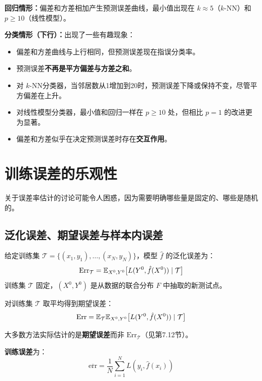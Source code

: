 \textbf{回归情形：}偏差和方差相加产生预测误差曲线，最小值出现在 $k \approx 5$（$k$-NN）和 $p \ge 10$（线性模型）。

\textbf{分类情形（下行）：}出现了一些有趣现象：
\begin{itemize}
    \item 偏差和方差曲线与上行相同，但预测误差现在指误分类率。
    \item 预测误差\textbf{不再是平方偏差与方差之和}。
    \item 对 $k$-NN分类器，当邻居数从1增加到20时，预测误差下降或保持不变，尽管平方偏差在上升。
    \item 对线性模型分类器，最小值和回归一样在 $p \ge 10$ 处，但相比 $p=1$ 的改进更为显著。
    \item 偏差和方差似乎在决定预测误差时存在\textbf{交互作用}。
\end{itemize}

\section{训练误差的乐观性}

关于误差率估计的讨论可能令人困惑，因为需要明确哪些量是固定的、哪些是随机的。

\subsection{泛化误差、期望误差与样本内误差}

给定训练集 $\mathcal{T} = \{(x_1, y_1), \ldots, (x_N, y_N)\}$，模型 $\hat{f}$ 的泛化误差为：
\begin{equation}\label{eq:Err_T}
    \mathrm{Err}_{\mathcal{T}} = \mathbb{E}_{X^0, Y^0}\bigl[L(Y^0, \hat{f}(X^0)) \mid \mathcal{T}\bigr]
\end{equation}
训练集 $\mathcal{T}$ 固定，$(X^0, Y^0)$ 是从数据的联合分布 $F$ 中抽取的新测试点。

对训练集 $\mathcal{T}$ 取平均得到期望误差：
\begin{equation}\label{eq:Err_expected}
    \mathrm{Err} = \mathbb{E}_{\mathcal{T}}\mathbb{E}_{X^0, Y^0}\bigl[L(Y^0, \hat{f}(X^0)) \mid \mathcal{T}\bigr]
\end{equation}

大多数方法实际估计的是\textbf{期望误差}而非 $\mathrm{Err}_{\mathcal{T}}$（见第7.12节）。

\textbf{训练误差}为：
\begin{equation}\label{eq:training_err}
    \overline{\mathrm{err}} = \frac{1}{N}\sum_{i=1}^{N} L(y_i, \hat{f}(x_i))
\end{equation}

